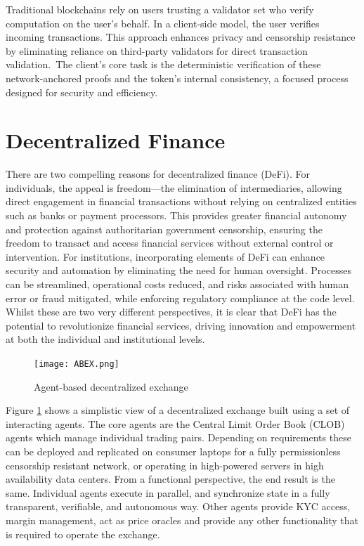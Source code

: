 \documentclass{article}
\begin{document}
Traditional blockchains rely on users trusting a validator set who verify computation on the user's behalf. In a client-side model, the user verifies incoming transactions. This approach enhances privacy and censorship resistance by eliminating reliance on third-party validators for direct transaction validation. The client's core task is the deterministic verification of these network-anchored proofs and the token's internal consistency, a focused process designed for security and efficiency.

\section{Decentralized Finance}

There are two compelling reasons for decentralized finance (DeFi). For individuals, the appeal is freedom---the elimination of intermediaries, allowing direct engagement in financial transactions without relying on centralized entities such as banks or payment processors. This provides greater financial autonomy and protection against authoritarian government censorship, ensuring the freedom to transact and access financial services without external control or intervention. For institutions, incorporating elements of DeFi can enhance security and automation by eliminating the need for human oversight. Processes can be streamlined, operational costs reduced, and risks associated with human error or fraud mitigated, while enforcing regulatory compliance at the code level. Whilst these are two very different perspectives, it is clear that DeFi has the potential to revolutionize financial services, driving innovation and empowerment at both the individual and institutional levels.

\begin{figure}[H]
    \centering
    \texttt{[image: ABEX.png]}
    \caption{Agent-based decentralized exchange}
    \label{fig:ABEX}
\end{figure}

Figure \ref{fig:ABEX} shows a simplistic view of a decentralized exchange built using a set of interacting agents. The core agents are the Central Limit Order Book (CLOB) agents which manage individual trading pairs. Depending on requirements these can be deployed and replicated on consumer laptops for a fully permissionless censorship resistant network, or operating in high-powered servers in high availability data centers. From a functional perspective, the end result is the same. Individual agents execute in parallel, and synchronize state in a fully transparent, verifiable, and autonomous way. Other agents provide KYC access, margin management, act as price oracles and provide any other functionality that is required to operate the exchange.
\end{document}
